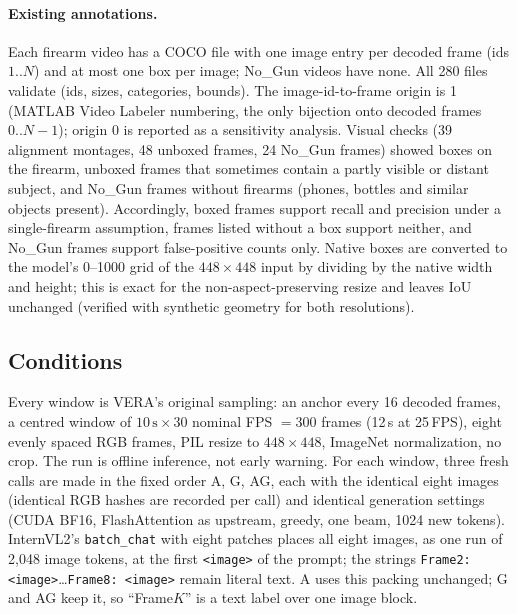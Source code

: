\documentclass[11pt]{article}
\begin{document}
\paragraph{Existing annotations.} Each firearm video has a COCO file with one image entry per decoded frame (ids $1..N$) and at most one box per image; No\_Gun videos have none. All 280 files validate (ids, sizes, categories, bounds). The image-id-to-frame origin is 1 (MATLAB Video Labeler numbering, the only bijection onto decoded frames $0..N-1$); origin 0 is reported as a sensitivity analysis. Visual checks (39 alignment montages, 48 unboxed frames, 24 No\_Gun frames) showed boxes on the firearm, unboxed frames that sometimes contain a partly visible or distant subject, and No\_Gun frames without firearms (phones, bottles and similar objects present). Accordingly, boxed frames support recall and precision under a single-firearm assumption, frames listed without a box support neither, and No\_Gun frames support false-positive counts only. Native boxes are converted to the model's 0--1000 grid of the $448\times448$ input by dividing by the native width and height; this is exact for the non-aspect-preserving resize and leaves IoU unchanged (verified with synthetic geometry for both resolutions).

\subsection{Conditions}
Every window is VERA's original sampling: an anchor every 16 decoded frames, a centred window of $10\,\text{s}\times30$ nominal FPS $=300$ frames (12\,s at 25\,FPS), eight evenly spaced RGB frames, PIL resize to $448\times448$, ImageNet normalization, no crop. The run is offline inference, not early warning. For each window, three fresh calls are made in the fixed order A, G, AG, each with the identical eight images (identical RGB hashes are recorded per call) and identical generation settings (CUDA BF16, FlashAttention as upstream, greedy, one beam, 1024 new tokens). InternVL2's \texttt{batch\_chat} with eight patches places all eight images, as one run of 2,048 image tokens, at the first \texttt{<image>} of the prompt; the strings \texttt{Frame2: <image>}\ldots\texttt{Frame8: <image>} remain literal text. A uses this packing unchanged; G and AG keep it, so ``Frame$K$'' is a text label over one image block.
\end{document}
